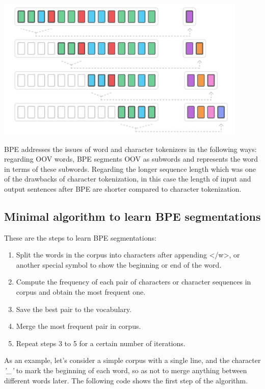 \begin{center}
\includegraphics[width=12cm]{figures/bpe.jpg}
\end{center}

BPE addresses the issues of word and character tokenizers in the following ways: regarding OOV words, BPE segments OOV as subwords and represents the word in terms of these subwords. Regarding the longer sequence length which was one of the drawbacks of character tokenization, in this case the length of input and output sentences after BPE are shorter compared to character tokenization.

\subsection{Minimal algorithm to learn BPE segmentations}

These are the steps to learn BPE segmentations:

\begin{enumerate}
    \item Split the words in the corpus into characters after appending </w>, or another special symbol to show the beginning or end of the word.
    \item Compute the frequency of each pair of characters or character sequences in corpus and obtain the most frequent one.
    \item Save the best pair to the vocabulary.
    \item Merge the most frequent pair in corpus.
    \item Repeat steps 3 to 5 for a certain number of iterations.
\end{enumerate}

As an example, let's consider a simple corpus with a single line, and the character \emph{'\_'} to mark the beginning of each word, so as not to merge anything between different words later. The following code shows the first step of the algorithm.

